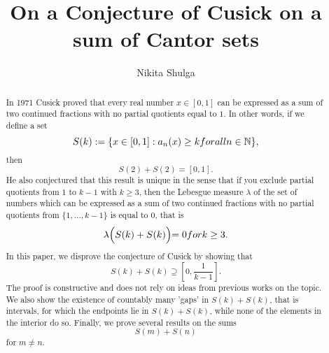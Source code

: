 \documentclass{amsart}
\theoremstyle{definition}
\newcommand{\N}{\mathbb N}%
\newcommand{\Q}{\mathbb Q}
\newcommand{\0}{\mbf 0}%
\renewcommand{\text}{\textup}
\def\N{\mathbb N}
\def\Q{\mathbb Q}
\begin{document}
\title{On a Conjecture of Cusick on a sum of Cantor sets}




 \author{Nikita Shulga}
 \address{Nikita Shulga,  Department of Mathematical and Physical Sciences,  La Trobe University, Bendigo 3552, Australia. }
 \date{}

\maketitle




\begin{abstract}
In 1971 Cusick proved that every real number $x\in[0,1]$ can be expressed as a sum of two continued fractions with no partial quotients equal to $1$. 
In other words, if we define a set
$$
S(k):= \{ x\in[0,1] : a_n(x) \geq k \text{ for all } n\in\N \},
$$
then
$$
S(2)+S(2) = [0,1].
$$
He also conjectured that this result is unique in the sense that if you exclude partial quotients from $1$ to $k-1$ with $k\geq3$, then the Lebesgue measure $\lambda$ of the set of numbers which can be expressed as a sum of two continued fractions with no partial quotients from $\{1,\ldots,k-1\}$ is equal to $0$, that is
$$\lambda\Bigl( S(k)+S(k) \Bigl)= 0 \text{ for }k\geq 3.$$
In this paper, we disprove the conjecture of Cusick by showing that
$$
S(k)+S(k) \supseteq  \left[0,\frac{1}{k-1}\right].
$$
The proof is constructive and does not rely on ideas from previous works on the topic. We also show the existence of countably many 'gaps' in $S(k)+S(k)$, that is intervals, for which the endpoints lie in $S(k)+S(k)$, while none of the elements in the interior do so. Finally, we prove several results on the sums 
$$
S(m)+S(n)
$$
for $m\neq n$.
\end{abstract}
\end{document}
